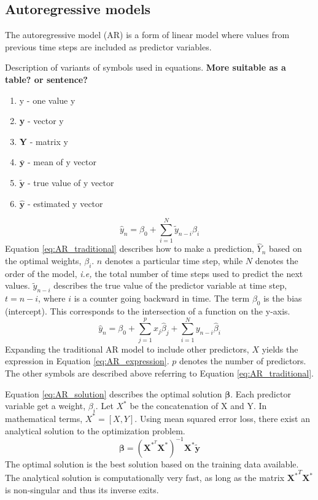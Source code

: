 \documentclass{article}
\begin{document}
\subsection{Autoregressive models} \label{sec:ARmodels}
The autoregressive model (AR) is a form of linear model where values from previous time steps are included as predictor variables. 

Description of variants of symbols used in equations. \textbf{More suitable as a table? or sentence?}
\begin{enumerate}
    \item y - one value y
    \item \textbf{y} - vector y
    \item \textbf{Y} - matrix y
    \item $\bar{\textbf{y}}$   - mean of y vector
    \item $\tilde{\textbf{y}}$ - true value of y vector 
    \item $\hat{\textbf{y}}$   - estimated y vector
\end{enumerate}

\begin{equation} \label{eq:AR_traditional}
    \hat{y}_n = \beta_0 + \sum_{i = 1}^{N} \tilde{y}_{n-i} \beta_{i}
\end{equation}
Equation \eqref{eq:AR_traditional} describes how to make a prediction, $\hat{Y}_n$ based on the optimal weights, $\beta_i$. $n$ denotes a particular time step, while $N$ denotes the order of the model, \textit{i.e,} the total number of time steps used to predict the next values. $\tilde{y}_{n-i}$ describes the true value of the predictor variable at time step, $t=n-i$, where $i$ is a counter going backward in time. The term $\beta_0$ is the bias (intercept). This corresponds to the intersection of a function on the y-axis.
\begin{equation} \label{eq:AR_expression}
    \hat{y}_n = \beta_0 + \sum_{j=1}^p x_j\hat{\beta}_j + \sum_{i = 1}^{N} y_{n-i}\hat{\beta}_{i}
\end{equation}
Expanding the traditional AR model to include other predictors, $X$ yields the expression in Equation \eqref{eq:AR_expression}. $p$ denotes the number of predictors. The other symbols are described above referring to Equation \eqref{eq:AR_traditional}.

Equation \eqref{eq:AR_solution} describes the optimal solution $\mathbf{\beta}$. Each predictor variable get a weight, $\beta_i$. Let $X^*$ be the concatenation of X and Y. In mathematical terms, $X^*=[X, Y]$. Using mean squared error loss, there exist an analytical solution to the optimization problem. 
\begin{equation} \label{eq:AR_solution}
    \mathbf{\beta}  = \left( \mathbf{X}^{*^T}\mathbf{X}^* \right)^{-1}\mathbf{X}^*\tilde{\mathbf{y}}
\end{equation}
The optimal solution is the best solution based on the training data available. The analytical solution is computationally very fast, as long as the matrix ${\mathbf{X}^*}^T\mathbf{X}^*$ is non-singular and thus its inverse exits.
\end{document}
